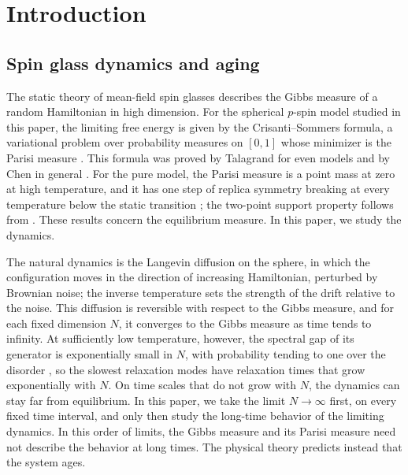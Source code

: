 \chapter{Introduction}\label{sec:introduction}

\section{Spin glass dynamics and aging}\label{sec:intro-background}

The static theory of mean-field spin glasses describes the Gibbs measure of a random Hamiltonian in high dimension. For the spherical $p$-spin model studied in this paper, the limiting free energy is given by the Crisanti--Sommers formula, a variational problem over probability measures on $[0,1]$ whose minimizer is the Parisi measure \cite{cs1992}. This formula was proved by Talagrand for even models \cite{talagrand2006} and by Chen in general \cite{chen2013}. For the pure model, the Parisi measure is a point mass at zero at high temperature, and it has one step of replica symmetry breaking at every temperature below the static transition \cite[Section~5]{auffingerchen2015}; the two-point support property follows from \cite[Proposition~2.2]{talagrand2006}. These results concern the equilibrium measure. In this paper, we study the dynamics.

The natural dynamics is the Langevin diffusion on the sphere, in which the configuration moves in the direction of increasing Hamiltonian, perturbed by Brownian noise; the inverse temperature sets the strength of the drift relative to the noise. This diffusion is reversible with respect to the Gibbs measure, and for each fixed dimension $N$, it converges to the Gibbs measure as time tends to infinity. At sufficiently low temperature, however, the spectral gap of its generator is exponentially small in $N$, with probability tending to one over the disorder \cite{gj2019}, so the slowest relaxation modes have relaxation times that grow exponentially with $N$. On time scales that do not grow with $N$, the dynamics can stay far from equilibrium. In this paper, we take the limit $N\to\infty$ first, on every fixed time interval, and only then study the long-time behavior of the limiting dynamics. In this order of limits, the Gibbs measure and its Parisi measure need not describe the behavior at long times. The physical theory predicts instead that the system ages.


